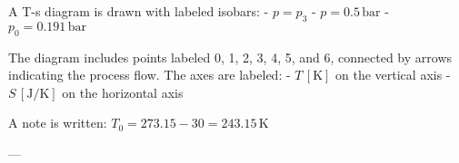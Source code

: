 A T-s diagram is drawn with labeled isobars:  
- \( p = p_3 \)  
- \( p = 0.5 \, \text{bar} \)  
- \( p_0 = 0.191 \, \text{bar} \)  

The diagram includes points labeled 0, 1, 2, 3, 4, 5, and 6, connected by arrows indicating the process flow. The axes are labeled:  
- \( T \, [\text{K}] \) on the vertical axis  
- \( S \, [\text{J/K}] \) on the horizontal axis  

A note is written:  
\( T_0 = 273.15 - 30 = 243.15 \, \text{K} \)  

---